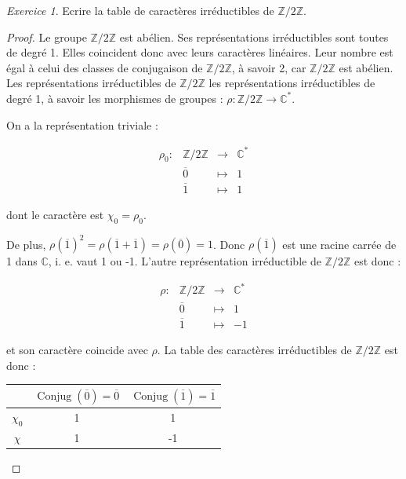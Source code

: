 \documentclass[french]{book}
\theoremstyle{definition}
\theoremstyle{remark}
\newtheorem{exo}{Exercice}
\begin{document}
\begin{exo}
  Ecrire la table de caractères irréductibles de \(\mathbb{Z}/{2}\mathbb{Z}\).
\end{exo}

\begin{proof}
  Le groupe \(\mathbb{Z}/{ 2 }\mathbb{Z}\) est abélien. Ses représentations irréductibles sont toutes de degré 1. Elles coincident donc avec leurs caractères linéaires. Leur nombre est égal à celui des classes de conjugaison de \(\mathbb{Z}/{ 2 }\mathbb{Z}\), à savoir 2, car \(\mathbb{Z}/{2}\mathbb{Z}\) est abélien. Les représentations irréductibles de \(\mathbb{Z}/{ 2 }\mathbb{Z}\) les représentations irréductibles de degré 1, à savoir les morphismes de groupes : \(\rho : \mathbb{Z}/{ 2 }\mathbb{Z} \longrightarrow \mathbb{C} ^{*}\).

  On a la représentation triviale :

  \[\begin{matrix}
  \rho_0 : & \mathbb{Z}/{ 2 }\mathbb{Z} & \longrightarrow & \mathbb{C} ^{*} \\
  \ & \overline{0}  & \longmapsto & 1 \\
  \ & \overline{1}  & \longmapsto & 1
  \end{matrix}\]

  dont le caractère est \(\chi_0 = \rho_0\).

  De plus, \(\rho(\overline{1})^2 = \rho(\overline{1}+ \overline{1}) = \rho(\overline{0}) = 1\). Donc \(\rho(\overline{1})\) est une racine carrée de 1 dans \(\mathbb{C}\), i. e. vaut 1 ou -1. L'autre représentation irréductible de \(\mathbb{Z}/{ 2 }\mathbb{Z}\) est donc :

  \[\begin{matrix}
  \rho : & \mathbb{Z}/{ 2 }\mathbb{Z} & \longrightarrow & \mathbb{C} ^{*} \\
  \ & \overline{0}  & \longmapsto & 1 \\
  \ & \overline{1}  & \longmapsto & -1
  \end{matrix}\]

  et son caractère coincide avec \(\rho\). La table des caractères irréductibles de \(\mathbb{Z}/{ 2 }\mathbb{Z}\) est donc :

  \begin{center}
    \begin{tabular}{|c|c|c|}
      \hline
      \ & $ \operatorname{Conjug}(\overline{0}) = \overline{0} $ & $ \operatorname{Conjug}(\overline{1}) = \overline{1}$ \\
      \hline
      $\chi_0$ & 1 & 1 \\
      \hline
      $\chi$ & 1 & -1 \\
      \hline
    \end{tabular}
  \end{center}


\end{proof}
\end{document}
